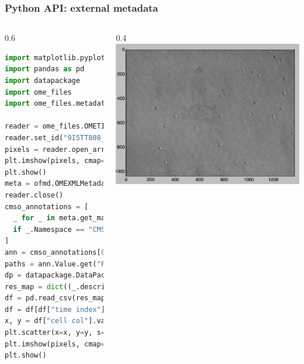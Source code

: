 \documentclass{beamer}
\begin{document}
\begin{frame}[fragile]
  \frametitle{Python API: external metadata}

  \begin{columns}
    \begin{column}{0.6\textwidth}
      \centering
      \begin{lstlisting}[language=Python,basicstyle=\tiny\ttfamily]
import matplotlib.pyplot as plt
import pandas as pd
import datapackage
import ome_files
import ome_files.metadata as ofmd

reader = ome_files.OMETIFFReader()
reader.set_id("9I5TT808_F00000010.companion.ome")
pixels = reader.open_array(0)
plt.imshow(pixels, cmap="gray")
plt.show()
meta = ofmd.OMEXMLMetadata(reader.get_ome_xml())
reader.close()
cmso_annotations = [
  _ for _ in meta.get_map_annotations()
  if _.Namespace == "CMSO/dpkg"
]
ann = cmso_annotations[0]
paths = ann.Value.get("FilePath")
dp = datapackage.DataPackage(paths[0])
res_map = dict((_.descriptor["name"], _.local_data_path) for _ in dp.resources)
df = pd.read_csv(res_map["objects_table"])
df = df[df["time index"] == 0]
x, y = df["cell col"].values, df["cell row"].values
plt.scatter(x=x, y=y, s=100, edgecolors='b', facecolors='none')
plt.imshow(pixels, cmap="gray")
plt.show()
      \end{lstlisting}
    \end{column}
    \begin{column}{0.4\textwidth}
      \centering
      \includegraphics[width=\textwidth]{cpp-dundee-2017-figures/tracking.png}\\
      \vspace{.5em}

\end{column}
\end{columns}
\end{frame}
\end{document}
